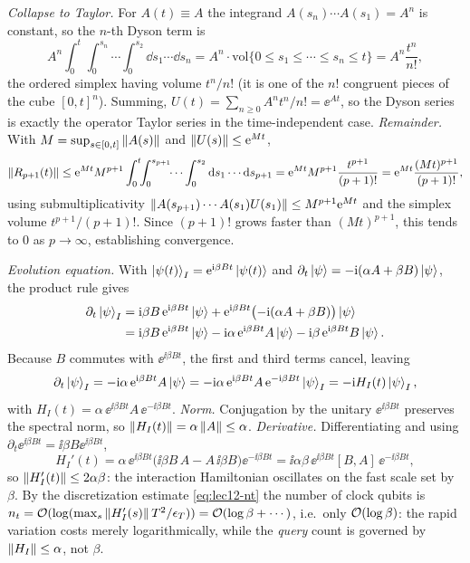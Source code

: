 \begin{solution}
\emph{Collapse to Taylor.} For $A(t)\equiv A$ the integrand $A(s_n)\cdots A(s_1)=A^n$ is
constant, so the $n$-th Dyson term is
\[
  A^n\int_0^t\!\!\int_0^{s_n}\!\!\cdots\int_0^{s_2}\dd s_1\cdots\dd s_n
  =A^n\cdot\mathrm{vol}\{0\le s_1\le\cdots\le s_n\le t\}=A^n\frac{t^n}{n!},
\]
the ordered simplex having volume $t^n/n!$ (it is one of the $n!$ congruent pieces of the
cube $[0,t]^n$). Summing, $U(t)=\sum_{n\ge0}A^nt^n/n!=\ee^{At}$, so the Dyson series is
exactly the operator Taylor series in the time-independent case. \emph{Remainder.} With
$M=\sup_{s\in[0,t]}\left\lVert A(s) \right\rVert$ and $\left\lVert U(s) \right\rVert\le\mathrm{e}^{Mt}$,
\[
  \left\lVert R_{p+1}(t) \right\rVert
  \le\mathrm{e}^{Mt}M^{p+1}\int_0^t\!\!\int_0^{s_{p+1}}\!\!\cdots\int_0^{s_2}
     \mathrm{d} s_1\cdots\mathrm{d} s_{p+1}
  =\mathrm{e}^{Mt}M^{p+1}\frac{t^{p+1}}{(p+1)!}=\mathrm{e}^{Mt}\frac{(Mt)^{p+1}}{(p+1)!},
\]
using submultiplicativity $\left\lVert A(s_{p+1})\cdots A(s_1)U(s_1) \right\rVert\le M^{p+1}\mathrm{e}^{Mt}$ and the
simplex volume $t^{p+1}/(p+1)!$. Since $(p+1)!$ grows faster than $(Mt)^{p+1}$, this tends
to $0$ as $p\to\infty$, establishing convergence.
\end{solution}

\begin{solution}
\emph{Evolution equation.} With $\ket{\psi(t)}_I=\mathrm{e}^{\mathrm{i}\beta Bt}\ket{\psi(t)}$ and
$\partial_t\ket\psi=-\mathrm{i}(\alpha A+\beta B)\ket\psi$, the product rule gives
\begin{align*}
  \partial_t\ket{\psi}_I
  &=\mathrm{i}\beta B\,\mathrm{e}^{\mathrm{i}\beta Bt}\ket\psi
    +\mathrm{e}^{\mathrm{i}\beta Bt}\bigl(-\mathrm{i}(\alpha A+\beta B)\bigr)\ket\psi\\
  &=\mathrm{i}\beta B\,\mathrm{e}^{\mathrm{i}\beta Bt}\ket\psi
    -\mathrm{i}\alpha\,\mathrm{e}^{\mathrm{i}\beta Bt}A\ket\psi
    -\mathrm{i}\beta\,\mathrm{e}^{\mathrm{i}\beta Bt}B\ket\psi.
\end{align*}
Because $B$ commutes with $\ee^{\ii\beta Bt}$, the first and third terms cancel, leaving
\[
  \partial_t\ket{\psi}_I=-\mathrm{i}\alpha\,\mathrm{e}^{\mathrm{i}\beta Bt}A\ket\psi
  =-\mathrm{i}\alpha\,\mathrm{e}^{\mathrm{i}\beta Bt}A\,\mathrm{e}^{-\mathrm{i}\beta Bt}\ket{\psi}_I
  =-\mathrm{i} H_I(t)\ket{\psi}_I,
\]
with $H_I(t)=\alpha\,\ee^{\ii\beta Bt}A\,\ee^{-\ii\beta Bt}$. \emph{Norm.} Conjugation by the
unitary $\ee^{\ii\beta Bt}$ preserves the spectral norm, so
$\left\lVert H_I(t) \right\rVert=\alpha\left\lVert A \right\rVert\le\alpha$. \emph{Derivative.} Differentiating and using
$\partial_t\ee^{\ii\beta Bt}=\ii\beta B\ee^{\ii\beta Bt}$,
\[
  H_I'(t)=\alpha\,\ee^{\ii\beta Bt}\bigl(\ii\beta B\,A-A\,\ii\beta B\bigr)\ee^{-\ii\beta Bt}
  =\ii\alpha\beta\,\ee^{\ii\beta Bt}[B,A]\,\ee^{-\ii\beta Bt},
\]
so $\left\lVert H_I'(t) \right\rVert\le2\alpha\beta$: the interaction Hamiltonian oscillates on the fast scale
set by $\beta$. By the discretization estimate \eqref{eq:lec12-nt} the number of clock
qubits is $n_t=\mathcal{O}(\log(\max_s\left\lVert H_I'(s) \right\rVert T^2/\epsilon_T))=\mathcal{O}(\log\beta+\cdots)$,
i.e.\ only $\mathcal{O}(\log\beta)$: the rapid variation costs merely logarithmically, while the
\emph{query} count is governed by $\left\lVert H_I \right\rVert\le\alpha$, not $\beta$.
\end{solution}

